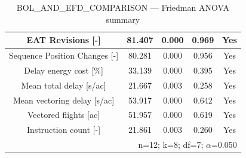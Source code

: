 \begin{table}[htbp]
\caption{BOL\_AND\_EFD\_COMPARISON — Friedman ANOVA summary}
\begin{center}
\footnotesize
\setlength{\tabcolsep}{3pt}
\renewcommand{\arraystretch}{1.000}
\begin{tabular}{|c|c|c|c|c|}
\hline
EAT Revisions [-] & 81.407 & 0.000 & 0.969 & Yes \\
\hline
Sequence Position Changes [-] & 80.281 & 0.000 & 0.956 & Yes \\
\hline
Delay energy cost [\%] & 33.139 & 0.000 & 0.395 & Yes \\
\hline
Mean total delay [s/ac] & 21.667 & 0.003 & 0.258 & Yes \\
\hline
Mean vectoring delay [s/ac] & 53.917 & 0.000 & 0.642 & Yes \\
\hline
Vectored flights [ac] & 51.957 & 0.000 & 0.619 & Yes \\
\hline
Instruction count [-] & 21.861 & 0.003 & 0.260 & Yes \\
\hline
\multicolumn{5}{r}{n=12; k=8; df=7; $\alpha$=0.050}\\
\end{tabular}
\label{tab:bol\_and\_efd\_comparison\_friedman}
\end{center}
\end{table}